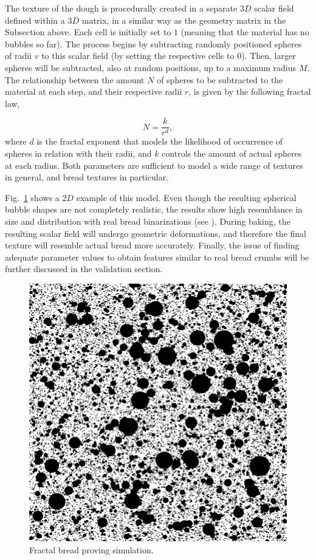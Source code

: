 \documentclass[spanish,a4paper,11pt,oneside,links]{report}
\begin{document}
The texture of the dough is procedurally created in a separate $3D$ scalar field defined within a $3D$ matrix, in a similar way as the geometry matrix in the Subsection above.
Each cell is initially set to $1$ (meaning that the material has no bubbles so far).
The process begins by subtracting randomly positioned spheres of radii $v$ to this scalar field (by setting the respective cells to $0$).
Then, larger spheres will be subtracted, also at random positions, up to a maximum radius $M$.
The relationship between the amount $N$ of spheres to be subtracted to the material at each step, and their respective radii $r$, is given by the following fractal law,

\begin{equation*}
N = \frac{k}{r^{d}},
\end{equation*}
where $d$ is the fractal exponent that models the likelihood of occurrence of spheres in relation with their radii, and $k$ controls the amount of actual spheres at each radius. 
Both parameters are sufficient to model a wide range of textures in general, and bread textures in particular.

Fig.~\ref{FigProving} shows a $2D$ example of this model.
Even though the resulting spherical bubble shapes are not completely realistic, the results show high resemblance in size and distribution with real bread binarizations (see \cite{Babin2006}).
During baking, the resulting scalar field will undergo geometric deformations, and therefore the final texture will resemble actual bread more accurately.
Finally, the issue of finding adequate parameter values to obtain features similar to real bread crumbs will be further discussed in the validation section.

\begin{figure}
\includegraphics[scale=0.28]{figures/bubbles}
\caption{Fractal bread proving simulation.}
\label{FigProving}
\end{figure}
\end{document}
